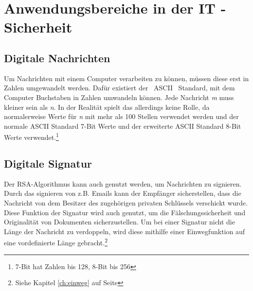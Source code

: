 \documentclass[14pt,a4paper]{scrartcl}
\begin{document}
\section{Anwendungsbereiche in der IT - Sicherheit}
	\subsection{Digitale Nachrichten}
Um Nachrichten mit einem Computer verarbeiten zu können, müssen diese erst in Zahlen umgewandelt werden. Dafür existiert der ~ASCII~ Standard, mit dem Computer Buchstaben in Zahlen umwandeln können. Jede Nachricht \textit{m} muss kleiner sein als \textit{n}. In der Realität spielt das allerdings keine Rolle, da normalerweise Werte für \textit{n} mit mehr als 100 Stellen verwendet werden und der normale ASCII Standard 7-Bit Werte und der erweiterte ASCII Standard 8-Bit Werte verwendet.\footnote{7-Bit hat Zahlen bis 128, 8-Bit bis 256}
	
	\subsection{Digitale Signatur}
	Der RSA-Algorithmus kann auch genutzt werden, um Nachrichten zu signieren. Durch das signieren von z.B. Emails kann der Empfänger sicherstellen, dass die Nachricht von dem Besitzer des zugehörigen privaten Schlüssels verschickt wurde. Diese Funktion der Signatur wird auch genutzt, um die Fälschungssicherheit und Originalität von  Dokumenten sicherzustellen. Um bei einer Signatur nicht die Länge der Nachricht zu verdoppeln, wird diese mithilfe einer Einwegfunktion auf eine vordefinierte Länge gebracht.\footnote{Siehe Kapitel \ref{ch:einweg} auf Seite \pageref{ch:einweg}}\\
\end{document}
